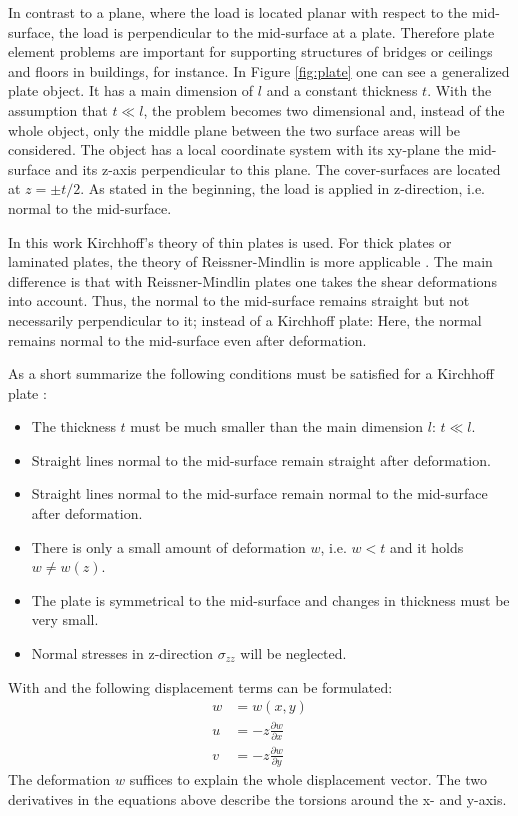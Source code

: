   In contrast to a plane, where the load is located planar with respect to the mid-surface, the load is perpendicular to the mid-surface at a plate. Therefore plate element problems are important for supporting structures of bridges or ceilings and floors in buildings, for instance. In Figure \ref{fig:plate} one can see a generalized plate object. It has a main dimension of $l$ and a constant thickness $t$. With the assumption that $t \ll l$, the problem becomes two dimensional and, instead of the whole object, only the middle plane between the two surface areas will be considered. The object has a local coordinate system with its xy-plane the mid-surface and its z-axis perpendicular to this plane. The cover-surfaces are located at $z = \pm t/2$. As stated in the beginning, the load is applied in z-direction, i.e. normal to the mid-surface.
  
  In this work Kirchhoff's theory of thin plates is used. For thick plates or laminated plates, the theory of Reissner-Mindlin is more applicable \cite{werkle1995finite}. The main difference is that with Reissner-Mindlin plates one takes the shear deformations into account. Thus, the normal to the mid-surface remains straight but not necessarily perpendicular to it; instead of a Kirchhoff plate: Here, the normal remains normal to the mid-surface even after deformation.
  
  As a short summarize the following conditions must be satisfied for a Kirchhoff plate \cite{steinke2005finite}:
  \begin{itemize}
  	\item The thickness $t$ must be much smaller than the main dimension $l$: $t \ll l$.
  	\item Straight lines normal to the mid-surface remain straight after deformation.
  	\item Straight lines normal to the mid-surface remain normal to the mid-surface after deformation.
  	\item There is only a small amount of deformation $w$, i.e. $w < t$ and it holds $w \ne w(z)$.
  	\item The plate is symmetrical to the mid-surface and changes in thickness must be very small.
  	\item Normal stresses in z-direction $\sigma_{zz}$ will be neglected.
  \end{itemize}
  
  With \cite{klein2013fem} and \cite{steinke2005finite} the following displacement terms can be formulated:
  \begin{align}
  w &= w(x,y) \\
  u &= -z \frac{\partial w}{\partial x}\\
  v &= -z \frac{\partial w}{\partial y}
  \end{align}
  The deformation $w$ suffices to explain the whole displacement vector. The two derivatives in the equations above describe the torsions around the x- and y-axis.

